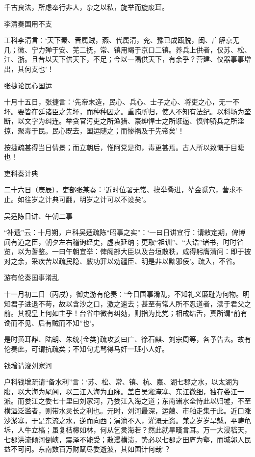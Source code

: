 \documentclass[]{article}
\begin{document}
千古良法，所虑奉行非人，杂之以私，旋举而旋废耳。

李清奏国用不支

工科李清言：`天下秦、晋属贼，燕、代属清，兖、豫已成瓯脱，闽、广解京无几；徽、宁力殚于安、芜二抚，常、镇用竭于京口二镇。养兵上供者，仅苏、松、江、浙。且昔以天下供天下，不足；今以一隅供天下，有余乎？营建、仪器事事增出，其何支也'！

张捷论民心国运

十月十五日，张捷言：`先帝末造，民心、兵心、士子之心、将吏之心，无一不坏。要皆在廷诸臣之先坏，而种种因之。重贿所归，使人不知有法纪。以科场为垄断，以文字为纠连。举贪官污吏之所渔猎、豪绅悍士之所诳逼、愤帅骄兵之所淫掠，聚毒于民。民心既去，国运随之；而惨祸及于先帝矣'！

按捷疏甚得当日情景；而立朝后，惟阿党是徇，毒更甚焉。古人所以致慨于目睫也！

吏科奏计典

二十六日（庚辰），吏部张某奏：`近时位署无常、挨举叠进，辇金觅穴，营求不止。如往岁之计典可翻，明岁之计可以不设矣'。

吴适陈日讲、午朝二事

``补遗''云：十月朔，户科吴适疏陈``昭事之实''：`一曰日讲宜行：请敕定期，俾博闻有道之臣，朝夕左右稽询经史，虚衷延纳；更取``祖训''、``大诰''诸书，时时省览，以为蓍鉴。一曰午朝宜举：俾阁部大臣以及台垣散秩，咸得躬膺清问：即于披对之余，采疾苦以疏民隐、覈功罪以劝疆臣、明是非以黜邪佞'。疏入，不省。

游有伦奏国事淆乱

十一月初二日（丙戌），御史游有伦奏：`今日国事淆乱，不知礼义廉耻为何物。明知君子进退不苟，故以含沙之口，激之速去；甚至有常人所不忍道者，渎于君父之前。其视皇上何如主乎！台省中微有纠劾，则指为比党；相戒结舌，真所谓``前有谗而不见、后有贼而不知''也'。

是时黄耳鼎、陆朗、朱统\{金类\}疏攻姜曰广、徐石麒、刘宗周等，各予告去。故有伦奏此，可谓抗疏矣；不知句尤骂得马奸一班小人好。

钱增请浚刘家河

户科钱增疏请``备水利''言：`苏、松、常、镇、杭、嘉、湖七郡之水，以太湖为腹，以大海为尾闾，以三江入海为血脉。盖自吴淞淹塞、东江微细，独存娄江一派。而娄江之委七十里曰刘家河，乃娄江入海之道；东南诸水全恃此以归墟，不至横溢泛滥者，则带水灵长之利也。元时，刘河最深，运艘、市舶走集于此。近口涨沙淤塞，于是东流之水，逆而向西；涓滴不入，灌溉无资。兼之岁岁旱魃，平畴龟坼，人牛立槁；虽复桔槔如林，何从乞灵海若？然此就旱暵言耳。万一大浸嵇天，七郡洪流倾河倒峡，震泽不能受；散漫横溃，势必以七郡之田庐为壑，而城郭人民益不可问。东南数百万财赋尽委逝波，其如国计何哉'？
\end{document}
